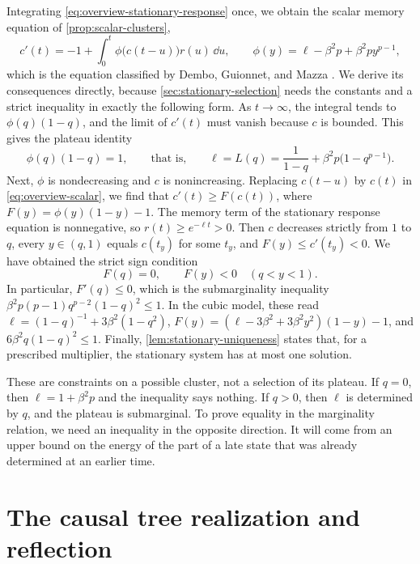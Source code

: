Integrating \eqref{eq:overview-stationary-response} once, we obtain the scalar memory equation of \cref{prop:scalar-clusters},
\begin{equation}\label{eq:overview-scalar}
 c'(t)=-1+\int_0^t\phi\bigl(c(t-u)\bigr)r(u)\,\dd u,\qquad
 \phi(y)=\ell-\beta^2p+\beta^2py^{p-1},
\end{equation}
which is the equation classified by Dembo, Guionnet, and Mazza \cite[arXiv version~1, Proposition~1.4, p.~5, and Section~5, pp.~17--20]{dgm2007}. We derive its consequences directly, because \cref{sec:stationary-selection} needs the constants and a strict inequality in exactly the following form. As $t\to\infty$, the integral tends to $\phi(q)(1-q)$, and the limit of $c'(t)$ must vanish because $c$ is bounded. This gives the plateau identity
\[
 \phi(q)(1-q)=1,\qquad\text{that is,}\qquad
 \ell=L(q)=\frac1{1-q}+\beta^2p\bigl(1-q^{p-1}\bigr).
\]
Next, $\phi$ is nondecreasing and $c$ is nonincreasing. Replacing $c(t-u)$ by $c(t)$ in \eqref{eq:overview-scalar}, we find that $c'(t)\ge F(c(t))$, where $F(y)=\phi(y)(1-y)-1$. The memory term of the stationary response equation is nonnegative, so $r(t)\ge e^{-\ell t}>0$. Then $c$ decreases strictly from $1$ to $q$, every $y\in(q,1)$ equals $c(t_y)$ for some $t_y$, and $F(y)\le c'(t_y)<0$. We have obtained the strict sign condition
\[
 F(q)=0,\qquad F(y)<0\quad(q<y<1).
\]
In particular, $F'(q)\le0$, which is the submarginality inequality $\beta^2p(p-1)q^{p-2}(1-q)^2\le1$. In the cubic model, these read $\ell=(1-q)^{-1}+3\beta^2(1-q^2)$, $F(y)=(\ell-3\beta^2+3\beta^2y^2)(1-y)-1$, and $6\beta^2q(1-q)^2\le1$. Finally, \cref{lem:stationary-uniqueness} states that, for a prescribed multiplier, the stationary system has at most one solution.

These are constraints on a possible cluster, not a selection of its plateau. If $q=0$, then $\ell=1+\beta^2p$ and the inequality says nothing. If $q>0$, then $\ell$ is determined by $q$, and the plateau is submarginal. To prove equality in the marginality relation, we need an inequality in the opposite direction. It will come from an upper bound on the energy of the part of a late state that was already determined at an earlier time.

\section{The causal tree realization and reflection}\label{sec:overview-tree}

